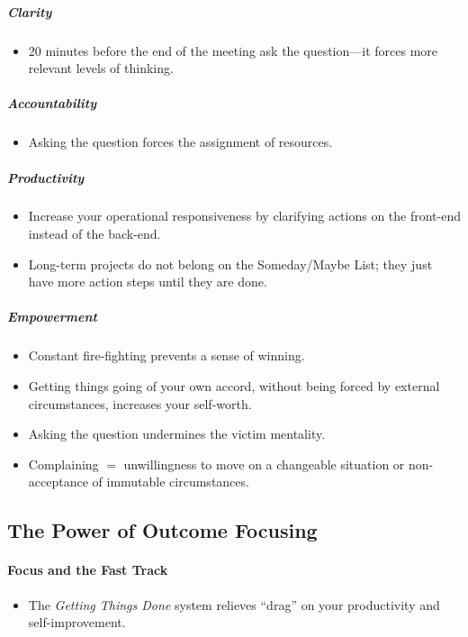 \documentclass{article}
\begin{document}
\subparagraph{Clarity}

\begin{itemize}
 \item 20 minutes before the end of the meeting ask the question---it forces more relevant levels of thinking.
\end{itemize}
 
\subparagraph{Accountability}

\begin{itemize}
 \item Asking the question forces the assignment of resources.
\end{itemize}

\subparagraph{Productivity}

\begin{itemize}
 \item Increase your operational responsiveness by clarifying actions on the front-end instead of the back-end.
 \item Long-term projects do not belong on the Someday/Maybe List; they just have more action steps until they are done.
\end{itemize}

\subparagraph{Empowerment}

\begin{itemize}
 \item Constant fire-fighting prevents a sense of winning.
 \item Getting things going of your own accord, without being forced by external circumstances, increases your self-worth.
 \item Asking the question undermines the victim mentality.
 \item Complaining $=$ unwillingness to move on a changeable situation or non-acceptance of immutable circumstances.
\end{itemize}

\subsection{The Power of Outcome Focusing}

\paragraph{Focus and the Fast Track}

\begin{itemize}
 \item The \textit{Getting Things Done} system relieves ``drag'' on your productivity and self-improvement.
\end{itemize}
\end{document}
